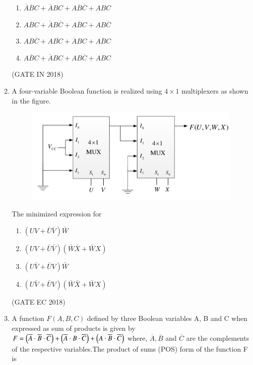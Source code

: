 \begin{enumerate}
\begin{enumerate}
            \item$\overline{A}\overline{B}C+\overline{A}BC+A\overline{B}\overline{C}+ABC$
            \item$\overline{ABC}+\overline{A}B\overline{C}+A\overline{B}C+AB\overline{C}$
            \item$A B\overline{C}+A\overline{B C}+\overline{A}B C+\overline{ABC}$
            \item$\overline{ABC}+\overline{A}BC+AB\overline{C}+ABC$
                  \end{enumerate}
		\hfill(GATE IN 2018)
\item
	\label{prob:gate EC 31}
	A four-variable Boolean function is realized using $4\times 1$ multiplexers as shown in the figure.
    \begin{figure}[!h]
        \centering
        \includegraphics[width=\columnwidth]{figs/2018-gate-ec-31.png}
        \caption{}
        \label{fig:mux}
    \end{figure}

   The minimized expression for 
    \begin{enumerate}
       \item $\left ( UV+\bar{U}\bar{V} \right )\bar{W}$
       \item $\left ( UV+\bar{U}\bar{V} \right )\left ( \bar{W}\bar{X}+\bar{W}X\right )$
       \item $\left ( U\bar{V}+\bar{U}V \right )\bar{W}$
       \item $\left ( U\bar{V}+\bar{U}V \right )\left ( \bar{W}\bar{X}+\bar{W}X\right )$

    \end{enumerate}
    \hfill(GATE EC 2018)

\item
	\label{prob:2023-gate-ec-9}
	A function $F(A, B, C)$ defined by three Boolean variables A, B and C when expressed as sum of products is given by \newline$ F = \left(\overline{A} \cdot \overline{B} \cdot \overline{C}\right) + \left(\overline{A} \cdot B \cdot \overline{C}\right) + \left(A \cdot \overline{B} \cdot \overline{C}\right) $
where, $\overline{A},\overline{B}$ and $\overline{C}$ are the complements of the respective variables.The product of sums (POS) form of the function F is


\end{enumerate}
